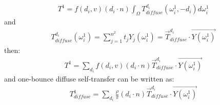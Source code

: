 \begin{align}
    T^{1}=f(d_i,v)(d_i \cdot n)\int_{\Omega}{T}_{diffuse}^{d_i}(\omega_i^{1},-d_i)d\omega_i^{1}
\end{align}
and
\begin{align}
   {T}_{diffuse}^{d_i}(\omega_i^{1})=\sum_{j=1}^{n^2}t_jY_j(\omega_i^{1})=\Vec{T}_{diffuse}^{d_i} \cdot \Vec{Y(\omega_i^{1})}
\end{align}
then:
\begin{align}
   T^{1}=\sum_{d_i}f(d_i,v)(d_i \cdot n)\Vec{T}_{diffuse}^{d_i} \cdot \Vec{Y(\omega_i^{1})}
\end{align}
and one-bounce diffuse self-transfer can be written as:
\begin{align}
   T_{diffuse}^{1}=\sum_{d_i}\frac{\rho}{\pi}(d_i \cdot n)\Vec{T}_{diffuse}^{d_i} \cdot \Vec{Y(\omega_i^{1})}
\end{align}

